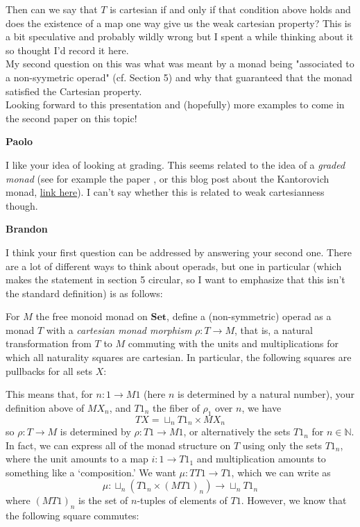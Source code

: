 \documentclass{amsart}
\newcommand{\respond}[1]{
  \vspace{1em} \textbf{#1}
}
\begin{document}
Then can we say that $T$ is cartesian if and only if that condition above holds and does the existence of a map one way give us the weak cartesian property? This is a bit speculative and probably wildly wrong but I spent a while thinking about it so thought I'd record it here. \\
My second question on this was what was meant by a monad being "associated to a non-syymetric operad" (cf. Section 5) and why that guaranteed that the monad satisfied the Cartesian property. \\
Looking forward to this presentation and (hopefully) more examples to come in the second paper on this topic!

\respond{Paolo}

I like your idea of looking at grading. This seems related to the idea of a \emph{graded monad} (see for example the paper \cite{gradedmonads}, or this blog post about the Kantorovich monad, \href{https://golem.ph.utexas.edu/category/2019/03/the_kantorovich_monad.html}{link here}).
I can't say whether this is related to weak cartesianness though.

\respond{Brandon}

I think your first question can be addressed by answering your second one.  There are a lot of different ways to think about operads, but one in particular (which makes the statement in section 5 circular, so I want to emphasize that this isn't the standard definition) is as follows:

For $M$ the free monoid monad on $\mathbf{Set}$, define a (non-symmetric) operad as a monad $T$ with a {\em cartesian monad morphism} $\rho : T \to M$, that is, a natural transformation from $T$ to $M$ commuting with the units and multiplications for which all naturality squares are cartesian.  In particular, the following squares are pullbacks for all sets $X$:

\begin{center}\end{center}

This means that, for $n : 1 \to M1$ (here $n$ is determined by a natural number), your definition above of $MX_n$, and $T1_n$ the fiber of $\rho_1$ over $n$, we have $$TX = \sqcup_n T1_n \times MX_n$$ so $\rho : T \to M$ is determined by $\rho : T1 \to M1$, or alternatively the sets $T1_n$ for $n \in \mathbb{N}$.  In fact, we can express all of the monad structure on $T$ using only the sets $T1_n$, where the unit amounts to a map $i : 1 \to T1_1$ and multiplication amounts to something like a `composition.' We want $\mu : TT1 \to T1$, which we can write as $$\mu : \sqcup_n (T1_n \times (MT1)_n) \to \sqcup_n T1_n$$ where $(MT1)_n$ is the set of $n$-tuples of elements of $T1$.  However, we know that the following square commutes:
\end{document}
